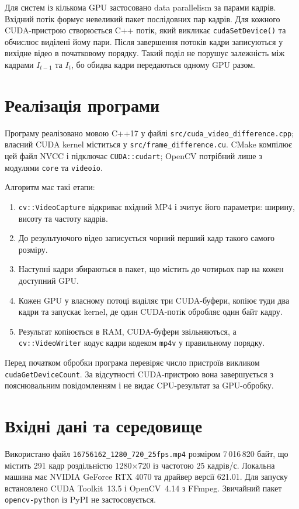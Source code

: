 \documentclass[14pt]{extarticle}
\begin{document}
Для систем із кількома GPU застосовано data parallelism за парами кадрів. Вхідний потік формує невеликий пакет послідовних пар кадрів. Для кожного CUDA-пристрою створюється C++ потік, який викликає \texttt{cudaSetDevice()} та обчислює виділені йому пари. Після завершення потоків кадри записуються у вихідне відео в початковому порядку. Такий поділ не порушує залежність між кадрами $I_{t-1}$ та $I_t$, бо обидва кадри передаються одному GPU разом.

\section{Реалізація програми}
Програму реалізовано мовою C++17 у файлі \texttt{src/cuda\_video\_difference.cpp}; власний CUDA kernel міститься у \texttt{src/frame\_difference.cu}. CMake компілює цей файл NVCC і підключає \texttt{CUDA::cudart}; OpenCV потрібний лише з модулями \texttt{core} та \texttt{videoio}.

Алгоритм має такі етапи:
\begin{enumerate}
  \item \texttt{cv::VideoCapture} відкриває вхідний MP4 і зчитує його параметри: ширину, висоту та частоту кадрів.
  \item До результуючого відео записується чорний перший кадр такого самого розміру.
  \item Наступні кадри збираються в пакет, що містить до чотирьох пар на кожен доступний GPU.
  \item Кожен GPU у власному потоці виділяє три CUDA-буфери, копіює туди два кадри та запускає kernel, де один CUDA-потік обробляє один байт кадру.
  \item Результат копіюється в RAM, CUDA-буфери звільняються, а \texttt{cv::VideoWriter} кодує кадри кодеком \texttt{mp4v} у правильному порядку.
\end{enumerate}

Перед початком обробки програма перевіряє число пристроїв викликом \texttt{cudaGetDeviceCount}. За відсутності CUDA-пристрою вона завершується з пояснювальним повідомленням і не видає CPU-результат за GPU-обробку.

\section{Вхідні дані та середовище}
Використано файл \texttt{16756162\_1280\_720\_25fps.mp4} розміром 7\,016\,820 байт, що містить 291 кадр роздільністю 1280$\times$720 із частотою 25 кадрів/с. Локальна машина має NVIDIA GeForce RTX 4070 та драйвер версії 621.01. Для запуску встановлено CUDA Toolkit~13.5 і OpenCV~4.14 з FFmpeg. Звичайний пакет \texttt{opencv-python} із PyPI не застосовується.
\end{document}
